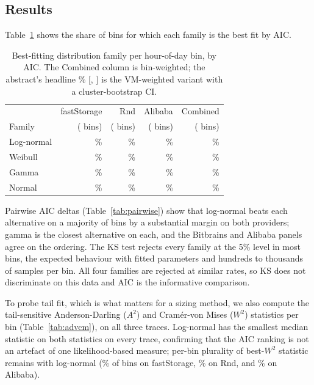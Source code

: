 \documentclass[11pt,a4paper]{article}
\begin{document}
\subsection{Results}
\label{sec:validation-results}

Table~\ref{tab:winner-share} shows the share of bins for which each family is
the best fit by AIC.

\begin{table}[t]
  \centering
  \small
  \begin{tabular}{lrrrr}
    \toprule
    & fastStorage & Rnd & Alibaba & Combined \\
    Family     & (\NBinsFs{} bins) & (\NBinsRnd{} bins) & (\AliBins{} bins) & (\CombinedNBins{} bins) \\
    \midrule
    Log-normal & \FsLogNorm{}\%   & \RndLogNorm{}\%   & \AliLogNorm{}\%   & \CombinedLogNormShare{}\% \\
    Weibull    & \FsWeibull{}\%   & \RndWeibull{}\%   & \AliWeibull{}\%   & \WeibullShareAll{}\% \\
    Gamma      & \FsGamma{}\%     & \RndGamma{}\%     & \AliGamma{}\%     & \GammaShareAll{}\%   \\
    Normal     & \FsNormal{}\%    & \RndNormal{}\%    & \AliNormal{}\%    & \NormalShareAll{}\%  \\
    \bottomrule
  \end{tabular}
  \caption{Best-fitting distribution family per hour-of-day bin, by AIC.
    The Combined column is bin-weighted; the abstract's headline
    \CombinedLogNormShareVmw{}\% [\CombinedLogNormShareCiLo,
    \CombinedLogNormShareCiHi] is the VM-weighted variant with a
    cluster-bootstrap CI.}
  \label{tab:winner-share}
\end{table}

Pairwise AIC deltas (Table~\ref{tab:pairwise}) show that log-normal beats each
alternative on a majority of bins by a substantial margin on both providers;
gamma is the closest alternative on each, and the Bitbrains and Alibaba
panels agree on the ordering. The KS test
rejects every family at the 5\% level in most bins, the expected behaviour
with fitted parameters and hundreds to thousands of samples per bin. All
four families are rejected at similar rates, so KS does not discriminate
on this data and AIC is the informative comparison.

To probe tail fit, which is what matters for a sizing method, we also
compute the tail-sensitive Anderson-Darling ($A^2$) and Cram\'er-von Mises
($W^2$) statistics per bin (Table~\ref{tab:advcm}), on all three traces.
Log-normal has the smallest median statistic on both statistics on every
trace, confirming that the AIC ranking is not an artefact of one
likelihood-based measure; per-bin plurality of best-$W^2$ statistic remains
with log-normal (\FsCvmShareLN{}\% of bins on fastStorage, \RnCvmShareLN{}\%
on Rnd, and \AliCvmShareLN{}\% on Alibaba).
\end{document}
